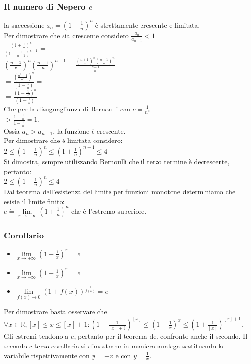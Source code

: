 \subsubsection{Il numero di Nepero $e$}
la successione $a_n=(1+\frac{1}{n})^n$ \`e strettamente crescente e limitata.\\
Per dimostrare che sia crescente considero $\frac{a_n}{a_{n-1}}<1$\\
$\frac{(1+\frac{1}{n})^n}{(1+\frac{1}{n-1})^{n-1}}=$\\
$(\frac{n+1}{n})^n(\frac{n-1}{n})^{n-1}=\frac{(\frac{n+1}{n})^n(\frac{n+1}{n})^n}{\frac{n-1}{n}}=$\\
$=\frac{(\frac{n^2-1}{n^2})^n}{(1-\frac{1}{n})}=$\\
$=\frac{(1-\frac{1}{n^2})^n}{(1-\frac{1}{n})}$\\
Che per la disuguaglianza di Bernoulli con $c=\frac{1}{n^2}$\\
$>\frac{1-\frac{1}{n}}{1-\frac{1}{n}}=1$.\\
Ossia $a_n>a_{n-1}$, la funzione \`e crescente.\\
Per dimostrare che \`e limitata considero:\\
$2\le (1+\frac{1}{n})^n\le (1+\frac{1}{n})^{n+1}\le 4$\\
Si dimostra, sempre utilizzando Bernoulli che il terzo termine \`e decrescente, pertanto:\\
$2\le (1+\frac{1}{n})^n\le 4$\\
Dal teorema dell'esistenza del limite per funzioni monotone determiniamo che esiste il limite finito:\\
$e\dot{=}\lim\limits_{x\rightarrow +\infty} (1+\frac{1}{n})^n$ che \`e l'estremo superiore.
\subsubsection{Corollario}
\begin{itemize}
\item $\lim\limits_{x\rightarrow+\infty} (1+\frac{1}{x})^x=e$
\item $\lim\limits_{x\rightarrow-\infty} (1+\frac{1}{x})^x=e$
\item $\lim\limits_{f(x)\rightarrow 0} (1+f(x))^\frac{1}{f(x)}=e$
\end{itemize}
Per dimostrare basta osservare che $\forall x\in\mathbb{R}, [x]\le x\le [x]+1:(1+\frac{1}{[x]+1})^{[x]}\le(1+\frac{1}{x})^x\le(1+\frac{1}{[x]})^{[x]+1}$. Gli estremi tendono
a $e$, pertanto per il teorema del confronto anche il secondo. Il secondo e terzo corollario si dimostrano in maniera analoga sostituendo la variabile rispettivamente con
$y=-x$ e con $y=\frac{1}{x}$.
